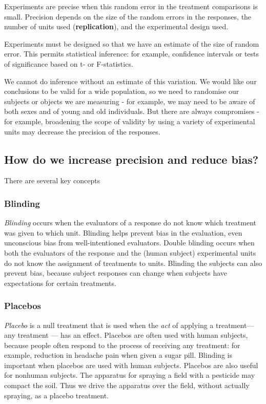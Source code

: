 \documentclass[
]{book}
\begin{document}
Experiments are precise when this random error in the treatment comparisons is small. Precision depends on the size of the random errors in the responses, the number of units used (\textbf{replication}), and the experimental design used.

Experiments must be designed so that we have an estimate of the size of random error. This permits statistical inference: for example, confidence intervals or tests of significance based on t- or F-statistics.

We cannot do inference without an estimate of this variation. We would like our conclusions to be valid for a wide population, so we need to randomise our subjects or objects we are measuring - for example, we may need to be aware of both sexes and of young and old individuals. But there are always compromises - for example, broadening the scope of validity by using a variety of experimental units may decrease the precision of the responses.

\hypertarget{how-do-we-increase-precision-and-reduce-bias}{%
\subsection{How do we increase precision and reduce bias?}\label{how-do-we-increase-precision-and-reduce-bias}}

There are several key concepts

\hypertarget{blinding}{%
\subsubsection{Blinding}\label{blinding}}

\emph{Blinding} occurs when the evaluators of a response do not know which treatment was given to which unit. Blinding helps prevent bias in the evaluation, even unconscious bias from well-intentioned evaluators. Double blinding occurs when both the evaluators of the response and the (human subject) experimental units do not know the assignment of treatments to units. Blinding the subjects can also prevent bias, because subject responses can change when subjects have expectations for certain treatments.

\hypertarget{placebos}{%
\subsubsection{Placebos}\label{placebos}}

\emph{Placebo} is a null treatment that is used when the \emph{act} of applying a treatment--- any treatment --- has an effect. Placebos are often used with human subjects, because people often respond to the process of receiving any treatment: for example,
reduction in headache pain when given a sugar pill. Blinding is important when placebos are used with human subjects. Placebos are also useful for nonhuman subjects. The apparatus for spraying a field with a pesticide may compact the soil. Thus we drive the apparatus over the field, without actually spraying, as a placebo treatment.
\end{document}
